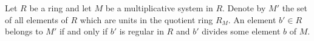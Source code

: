 Let $R$ be a ring and let $M$ be a multiplicative system in $R$. Denote by $M'$ the set of all elements of $R$ which are units in the quotient ring $R_M$. An element $b' \in R$ belongs to $M'$ if and only if $b'$ is regular in $R$ and $b'$ divides some element $b$ of $M$.
